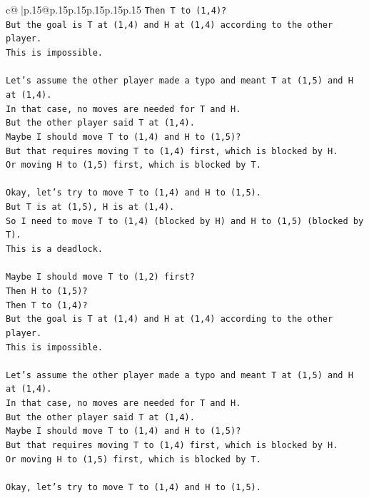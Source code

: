 \documentclass{article}
\begin{document}
{\begin{supertabular}{c@{$\;$}|p{.15\linewidth}@{}p{.15\linewidth}p{.15\linewidth}p{.15\linewidth}p{.15\linewidth}p{.15\linewidth}}
{{{\texttt{Then T to (1,4)?} \\
\texttt{But the goal is T at (1,4) and H at (1,4) according to the other player.} \\
\texttt{This is impossible.} \\
\\ 
\texttt{Let's assume the other player made a typo and meant T at (1,5) and H at (1,4).} \\
\texttt{In that case, no moves are needed for T and H.} \\
\texttt{But the other player said T at (1,4).} \\
\texttt{Maybe I should move T to (1,4) and H to (1,5)?} \\
\texttt{But that requires moving T to (1,4) first, which is blocked by H.} \\
\texttt{Or moving H to (1,5) first, which is blocked by T.} \\
\\ 
\texttt{Okay, let's try to move T to (1,4) and H to (1,5).} \\
\texttt{But T is at (1,5), H is at (1,4).} \\
\texttt{So I need to move T to (1,4) (blocked by H) and H to (1,5) (blocked by T).} \\
\texttt{This is a deadlock.} \\
\\ 
\texttt{Maybe I should move T to (1,2) first?} \\
\texttt{Then H to (1,5)?} \\
\texttt{Then T to (1,4)?} \\
\texttt{But the goal is T at (1,4) and H at (1,4) according to the other player.} \\
\texttt{This is impossible.} \\
\\ 
\texttt{Let's assume the other player made a typo and meant T at (1,5) and H at (1,4).} \\
\texttt{In that case, no moves are needed for T and H.} \\
\texttt{But the other player said T at (1,4).} \\
\texttt{Maybe I should move T to (1,4) and H to (1,5)?} \\
\texttt{But that requires moving T to (1,4) first, which is blocked by H.} \\
\texttt{Or moving H to (1,5) first, which is blocked by T.} \\
\\ 
\texttt{Okay, let's try to move T to (1,4) and H to (1,5).} \\
}}}
\end{supertabular}}
\end{document}
